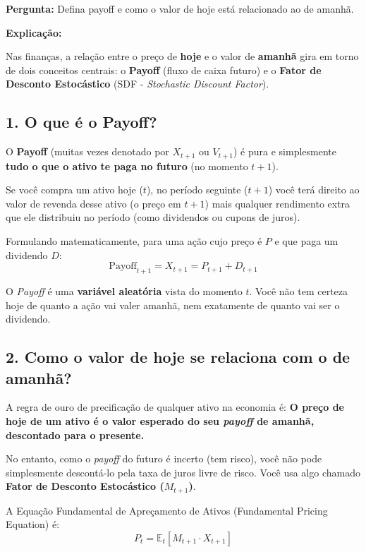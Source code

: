 \documentclass[12pt,a4paper]{article}
\begin{document}
\textbf{Pergunta:} Defina payoff e como o valor de hoje está relacionado ao de amanhã.

\textbf{Explicação:}

Nas finanças, a relação entre o preço de \textbf{hoje} e o valor de \textbf{amanhã} gira em torno de dois conceitos centrais: o \textbf{Payoff} (fluxo de caixa futuro) e o \textbf{Fator de Desconto Estocástico} (SDF - \textit{Stochastic Discount Factor}).

\subsection{1. O que é o Payoff?}

O \textbf{Payoff} (muitas vezes denotado por $X_{t+1}$ ou $V_{t+1}$) é pura e simplesmente \textbf{tudo o que o ativo te paga no futuro} (no momento $t+1$).

Se você compra um ativo hoje ($t$), no período seguinte ($t+1$) você terá direito ao valor de revenda desse ativo (o preço em $t+1$) mais qualquer rendimento extra que ele distribuiu no período (como dividendos ou cupons de juros).

Formulando matematicamente, para uma ação cujo preço é $P$ e que paga um dividendo $D$:
\begin{equation}
    \text{Payoff}_{t+1} = X_{t+1} = P_{t+1} + D_{t+1}
\end{equation}

O \textit{Payoff} é uma \textbf{variável aleatória} vista do momento $t$. Você não tem certeza hoje de quanto a ação vai valer amanhã, nem exatamente de quanto vai ser o dividendo.

\subsection{2. Como o valor de hoje se relaciona com o de amanhã?}

A regra de ouro de precificação de qualquer ativo na economia é: \textbf{O preço de hoje de um ativo é o valor esperado do seu \textit{payoff} de amanhã, descontado para o presente.}

No entanto, como o \textit{payoff} do futuro é incerto (tem risco), você não pode simplesmente descontá-lo pela taxa de juros livre de risco. Você usa algo chamado \textbf{Fator de Desconto Estocástico ($M_{t+1}$)}.

A Equação Fundamental de Apreçamento de Ativos (Fundamental Pricing Equation) é:
\begin{equation}
    P_t = \mathbb{E}_t [ M_{t+1} \cdot X_{t+1} ]
\end{equation}
\end{document}
